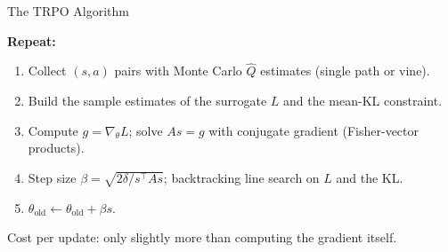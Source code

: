 \documentclass[aspectratio=169]{beamer}
\newcommand{\told}{\theta_{\mathrm{old}}}
\begin{document}
\begin{frame}{The TRPO Algorithm}
  \begin{slatebox}
    \textbf{Repeat:}
    \begin{enumerate}
      \item Collect $(s,a)$ pairs with Monte Carlo $\hat Q$ estimates (single path or vine).
      \item Build the sample estimates of the surrogate $L$ and the mean-KL constraint.
      \item Compute $g = \nabla_\theta L$; solve $As = g$ with conjugate gradient (Fisher-vector products).
      \item Step size $\beta = \sqrt{2\delta / s^\top A s}$; backtracking line search on $L$ and the KL.
      \item $\told \leftarrow \told + \beta s$.
    \end{enumerate}
  \end{slatebox}
  \vspace{4pt}
  {\small Cost per update: only slightly more than computing the gradient itself.}
\end{frame}
\end{document}
